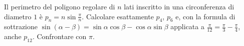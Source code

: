 \begin{esercizio}[\liv{3}]
Il perimetro del poligono regolare di $n$ lati inscritto in una circonferenza di diametro $1$ è $p_n=n\sin\frac\pi n$. Calcolare esattamente $p_4$, $p_6$ e, con la formula di sottrazione $\sin(\alpha-\beta)=\sin\alpha\cos\beta-\cos\alpha\sin\beta$ applicata a $\frac\pi{12}=\frac\pi3-\frac\pi4$, anche $p_{12}$. Confrontare con $\pi$.
\end{esercizio}

\stampasoluzioni
